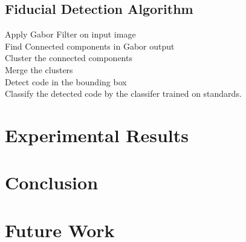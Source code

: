 \documentclass[runningheads]{llncs}
\begin{document}
\subsection{Fiducial Detection Algorithm}
Apply Gabor Filter on input image \\
Find Connected components in Gabor output \\
Cluster the connected components \\
Merge the clusters \\
Detect code in the bounding box \\
Classify the detected code by the classifer trained on standards. 

\section{Experimental Results}

\section{Conclusion}

\section{Future Work}



\end{document}
